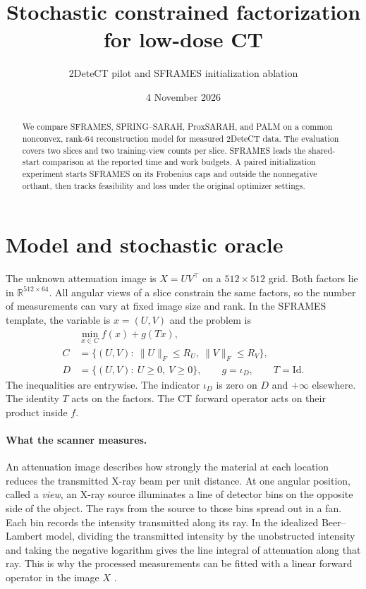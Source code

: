 \documentclass[11pt]{article}
\title{Stochastic constrained factorization for low-dose CT}
\author{2DeteCT pilot and SFRAMES initialization ablation}
\date{4 November 2026}
\begin{document}
\maketitle

\begin{abstract}
We compare SFRAMES, SPRING--SARAH, ProxSARAH, and PALM on a common
nonconvex, rank-64 reconstruction model for measured 2DeteCT data.
The evaluation covers two slices and two training-view counts per slice.
SFRAMES leads the shared-start comparison at the reported time and work budgets.
A paired initialization experiment starts SFRAMES on its Frobenius caps
and outside the nonnegative orthant, then tracks feasibility and loss
under the original optimizer settings.
\end{abstract}
\section{Model and stochastic oracle}
\label{sec:ct-model}

The unknown attenuation image is \(X=UV^\top\) on a \(512\times512\) grid. Both factors lie in \(\mathbb R^{512\times64}\). All angular views of a slice constrain the same factors, so the number of measurements can vary at fixed image size and rank. In the SFRAMES template, the variable is \(x=(U,V)\) and the problem is
\begin{align}
  &\min_{x\in C} f(x)+g(Tx), \\
  C&=\{(U,V):\ \|U\|_F\le R_U,\ \|V\|_F\le R_V\}, \\
  D&=\{(U,V):\ U\ge 0,\ V\ge 0\}, \qquad g=\iota_D,\qquad T=\mathrm{Id}.
\end{align}
The inequalities are entrywise. The indicator \(\iota_D\) is zero on \(D\) and \(+\infty\) elsewhere. The identity \(T\) acts on the factors. The CT forward operator acts on their product inside \(f\).

\paragraph{What the scanner measures.}
An attenuation image describes how strongly the material at each location reduces the transmitted X-ray beam per unit distance. At one angular position, called a \emph{view}, an X-ray source illuminates a line of detector bins on the opposite side of the object. The rays from the source to those bins spread out in a fan. Each bin records the intensity transmitted along its ray. In the idealized Beer--Lambert model, dividing the transmitted intensity by the unobstructed intensity and taking the negative logarithm gives the line integral of attenuation along that ray. This is why the processed measurements can be fitted with a linear forward operator in the image \(X\) \cite{detect}.
\end{document}
